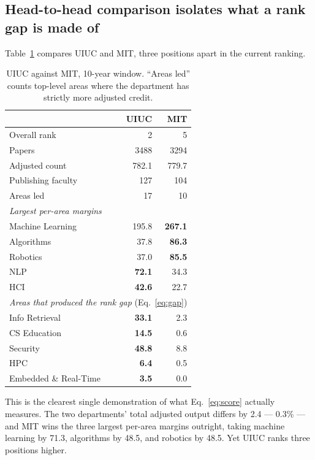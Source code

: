\documentclass[11pt]{article}
\begin{document}
\subsection{Head-to-head comparison isolates what a rank gap is made of}
\label{sec:comparison}

Table~\ref{tab:compareuiuc} compares UIUC and MIT, three positions apart in the
current ranking.

\begin{table}[t]
\centering
\caption{UIUC against MIT, 10-year window. ``Areas led'' counts top-level areas
where the department has strictly more adjusted credit.}
\label{tab:compareuiuc}
\begin{tabular}{lrr}
\toprule
& UIUC & MIT \\
\midrule
Overall rank        & 2      & 5 \\
Papers              & 3488   & 3294 \\
Adjusted count      & 782.1  & 779.7 \\
Publishing faculty  & 127    & 104 \\
Areas led           & 17     & 10 \\
\midrule
\multicolumn{3}{l}{\emph{Largest per-area margins}} \\
Machine Learning    & 195.8 & \textbf{267.1} \\
Algorithms          & 37.8  & \textbf{86.3} \\
Robotics            & 37.0  & \textbf{85.5} \\
NLP                 & \textbf{72.1} & 34.3 \\
HCI                 & \textbf{42.6} & 22.7 \\
\midrule
\multicolumn{3}{l}{\emph{Areas that produced the rank gap} (Eq.~\ref{eq:gap})} \\
Info Retrieval      & \textbf{33.1} & 2.3 \\
CS Education        & \textbf{14.5} & 0.6 \\
Security            & \textbf{48.8} & 8.8 \\
HPC                 & \textbf{6.4}  & 0.5 \\
Embedded \& Real-Time & \textbf{3.5} & 0.0 \\
\bottomrule
\end{tabular}
\end{table}

This is the clearest single demonstration of what Eq.~\ref{eq:score} actually
measures. The two departments' total adjusted output differs by 2.4 --- 0.3\%
--- and MIT wins the three largest per-area margins outright, taking machine
learning by 71.3, algorithms by 48.5, and robotics by 48.5. Yet UIUC ranks
three positions higher.
\end{document}
